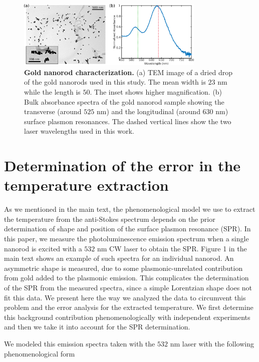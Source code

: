 \documentclass[journal=nalefd,manuscript=letter]{achemso}
\newcommand{\nm}{\ensuremath{\,\textrm{nm}}}
\begin{document}
\begin{figure}[htp] \centering
\includegraphics[width=0.8\textwidth]{Figures/Supplementary/07_GNRs_Characterization_TEM/GNRs_characterization.png}
\caption{\textbf{Gold nanorod characterization.} (a) TEM image of a dried drop of  the gold nanorods used in this study. The mean width is $23$ nm while the length is $50$. The inset shows higher magnification. (b) Bulk absorbance spectra of the gold nanorod sample showing the transverse (around $525$ nm) and the longitudinal (around $630$ nm) surface plasmon resonances. The dashed vertical lines show the two laser wavelengths used in this work.}
	\label{fg:nr-char}
\end{figure}


\pagebreak
\section{Determination of the error in the temperature extraction}\label{sec:discussion_errors} 

As we mentioned in the main text, the phenomenological model we use to extract the temperature from the anti-Stokes spectrum depends on the prior determination of shape and position of the surface plasmon resonance (SPR). 
In this paper, we measure the photoluminescence emission spectrum 
when a single nanorod is excited with a $532\,\nm$ CW laser to obtain the SPR. 
Figure 1 in the main text shows an example of such spectra for an individual nanorod. 
An asymmetric shape is measured, due to some plasmonic-unrelated contribution from gold added to the plasmonic emission. 
This complicates the determination of the SPR from the measured spectra, since a simple 
Lorentzian shape does not fit this data. 
We present here the way we analyzed the data to circumvent this problem and the error analysis for the 
extracted temperature. 
We first determine this background contribution phenomenologically with independent experiments and then 
we take it into account for the SPR determination. 

We modeled this emission spectra taken with the $532$ nm laser with the following phenomenological form
\end{document}
